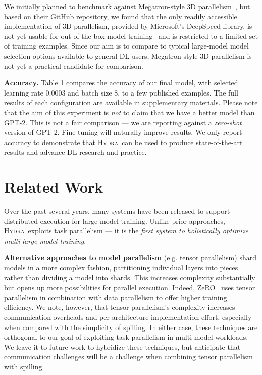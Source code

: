 \documentclass{article}
\newcommand{\system}{\textsc{Hydra}}
\begin{document}
We initially planned to benchmark against Megatron-style 3D parallelism~\cite{narayanan2021efficient}, but based on their GitHub repository, we found that the only readily accessible implementation of 3D parallelism, provided by Microsoft's DeepSpeed library, is not yet usable for out-of-the-box model training~\cite{deepspeedissue1,deepspeedissue2} and is restricted to a limited set of training examples. Since our aim is to compare to typical large-model model selection options available to general DL users, Megatron-style 3D parallelism is not yet a practical candidate for comparison.

\textbf{Accuracy.} Table 1 compares the accuracy of our final model, with selected learning rate 0.0003 and batch size 8, to a few published examples. The full results of each configuration are available in supplementary materials. Please note that the aim of this experiment is \textit{not} to claim that we have a better model than GPT-2. This is not a fair comparison --- we are reporting against a \textit{zero-shot} version of GPT-2. Fine-tuning will naturally improve results. We only report accuracy to demonstrate that \system~can be used to produce state-of-the-art results and advance DL research and practice. 

\section{Related Work}
\label{sec:related}
Over the past several years, many systems have been released to support distributed execution for large-model training. Unlike prior approaches, \system~exploits task parallelism --- it is the \textit{first system to holistically optimize multi-large-model training}.

\textbf{Alternative approaches to model parallelism} (e.g. tensor parallelism) shard models in a more complex fashion, partitioning individual layers into pieces rather than dividing a model into shards. This increases complexity substantially but opens up more possibilities for parallel execution. Indeed, ZeRO~\cite{zeroDeep,zeroOpt} uses tensor parallelism in combination with data parallelism to offer higher training efficiency. We note, however, that tensor parallelism's complexity increases communication overheads and per-architecture implementation effort, especially when compared with the simplicity of spilling. In either case, these techniques are orthogonal to our goal of exploiting task parallelism in multi-model workloads. We leave it to future work to hybridize these techniques, but anticipate that communication challenges will be a challenge when combining tensor parallelism with spilling.
\end{document}

